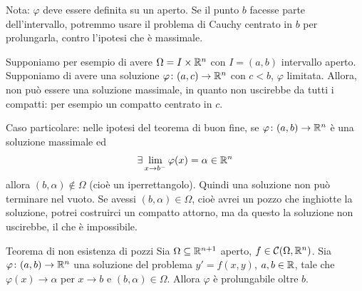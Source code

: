 \documentclass[a4paper]{article}
\begin{document}
\begin{radioactive}
Nota: \(\varphi\) deve essere definita su un aperto. Se il punto \(b\)
facesse parte dell'intervallo, potremmo usare il problema di Cauchy centrato in \(b\)
per prolungarla, contro l'ipotesi che è massimale.

Supponiamo per esempio di avere \(\Omega = I \times \mathbb{R}^n\)
con \(I = (a,b)\) intervallo aperto.
Supponiamo di avere una soluzione \(\varphi \colon (a,c) \to \mathbb{R}^n\)
con \(c < b\), \(\varphi\) limitata. Allora, non può essere una soluzione massimale,
in quanto non uscirebbe da tutti i compatti: per esempio un compatto centrato in \(c\).

Caso particolare: nelle ipotesi del teorema di buon fine, se
\(\varphi \colon (a,b) \to \mathbb{R}^n\)
è una soluzione massimale ed
\[
    \exists \lim_{x \to b^-} \varphi(x) = \alpha \in \mathbb{R}^n
\]
allora \((b, \alpha) \notin \Omega\) (cioè un iperrettangolo).
Quindi una soluzione non può terminare nel vuoto.
Se avessi \((b, \alpha) \in \Omega\), cioè avrei un pozzo che inghiotte la soluzione, potrei costruirci un compatto attorno, ma da questo
la soluzione non uscirebbe, il che è impossibile.
\end{radioactive}

\begin{radioactive}
\begin{snippettheorem}{Teorema di non esistenza di pozzi}
    Sia \(\Omega \subseteq \mathbb{R}^{n+1}\) aperto,
    \(f \in \mathcal C(\Omega, \mathbb{R}^n)\).
    Sia \(\varphi \colon (a,b) \to \mathbb{R}^n\)
    una soluzione del problema \(y'=f(x,y)\),
    \(a,b\in \mathbb{R}\), tale che \(\varphi(x) \to \alpha\) per \(x \to b\)
    e \((b, \alpha) \in \Omega\).
    Allora \(\varphi\) è prolungabile oltre \(b\).
\end{snippettheorem}
\end{radioactive}
\end{document}
